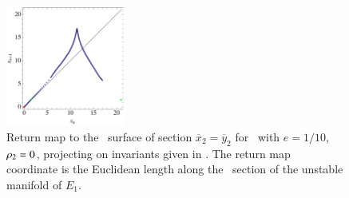 {%
\begin{figure}[ht]
\begin{center}
\includegraphics[width=0.35\textwidth]{../figs/CLEinvRM}
\end{center}
\caption[Return map for Complex Lorenz flow]{
Return map to the \Poincare\ surface of section
$\overline{x}_2=\overline{y}_2$ for \cLe\ with $e=1/10$,
$\rho_2=0$, projecting on invariants given in
. The return map coordinate is the
Euclidean length along the \Poincare\ section of the unstable
manifold of $E_1$.
    }
\label{fig:CLEinvRM}
\end{figure}
} %
